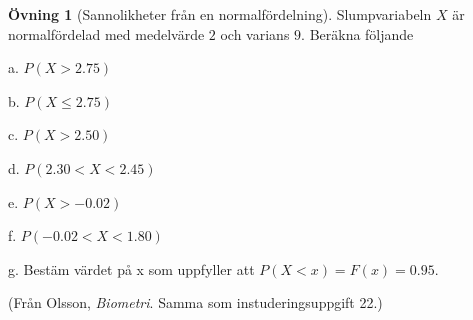 \documentclass[
]{book}
\theoremstyle{definition}
\theoremstyle{definition}
\theoremstyle{definition}
\newtheorem{exercise}{Övning}[chapter]
\theoremstyle{definition}
\theoremstyle{remark}
\begin{document}
\begin{exercise}[Sannolikheter från en normalfördelning]
Slumpvariabeln \(X\) är normalfördelad med medelvärde \(2\) och varians \(9\). Beräkna följande

a. \(P(X > 2.75)\)

b. \(P(X \leq 2.75)\)

c. \(P(X > 2.50)\)

d. \(P(2.30 < X < 2.45)\)

e. \(P(X > -0.02)\)

f. \(P(-0.02 < X < 1.80)\)

g. Bestäm värdet på x som uppfyller att \(P(X < x) = F(x) = 0.95\).

(Från Olsson, \emph{Biometri}. Samma som instuderingsuppgift 22.)
\end{exercise}
\end{document}
